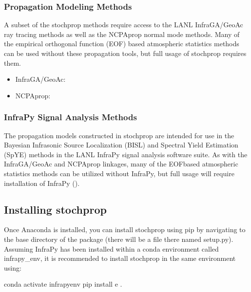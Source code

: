 \documentclass[letterpaper,10pt,english]{sphinxmanual}
\begin{document}
\subsubsection{Propagation Modeling Methods}
\label{\detokenize{installation:propagation-modeling-methods}}
A subset of the stochprop methods require access to the  LANL InfraGA/GeoAc ray tracing methods as well as the NCPAprop normal mode methods.  Many of the
empirical orthogonal function (EOF) based atmospheric statistics methods can be used without these propagation tools, but full usage of stochprop requires them.
\begin{itemize}
\item {} 
InfraGA/GeoAc: 

\item {} 
NCPAprop: 

\end{itemize}


\subsubsection{InfraPy Signal Analysis Methods}
\label{\detokenize{installation:infrapy-signal-analysis-methods}}
The propagation models constructed in stochprop are intended for use in the Bayesian Infrasonic Source Localization (BISL) and Spectral Yield Estimation (SpYE)
methods in the LANL InfraPy signal analysis software suite.  As with the InfraGA/GeoAc and NCPAprop linkages, many of the EOF\sphinxhyphen{}based atmospheric statistics methods
can be utilized without InfraPy, but full usage will require installation of InfraPy ().


\subsection{Installing stochprop}
\label{\detokenize{installation:installing-stochprop}}
Once Anaconda is installed, you can install stochprop using pip by navigating to the base directory of the package (there will be a file there
named setup.py).  Assuming InfraPy has been installed within a conda environment called infrapy\_env, it is recommended to install stochprop in the same environment using:

\begin{sphinxVerbatim}[commandchars=\\\{\}]
\PYGZgt{}\PYGZgt{} conda activate infrapy\PYGZus{}env
\PYGZgt{}\PYGZgt{} pip install \PYGZhy{}e .
\end{sphinxVerbatim}
\end{document}
